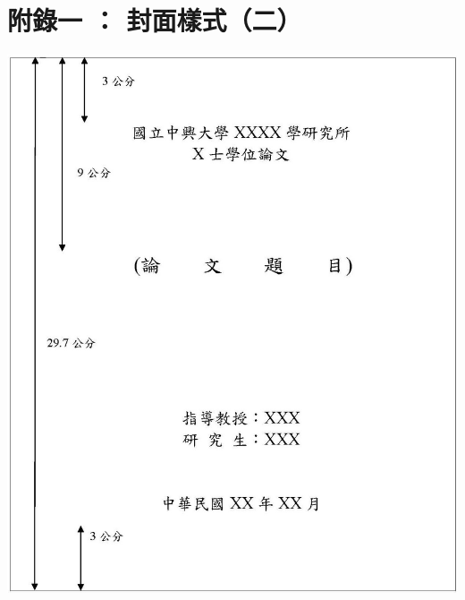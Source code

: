 \documentclass[12pt,oneside,openany,a4paper]{book}
\begin{document}
\chapter{附錄一 ： 封面樣式（二）}
    \begin{center}
        \includegraphics[bb=0 0 1223 1457,width=\textwidth]{TitlePage2.jpg}
    \end{center}
\end{document}
